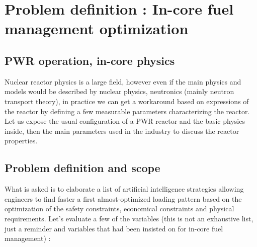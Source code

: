 \section{Problem definition : In-core fuel management optimization}

\subsection{PWR operation, in-core physics}

\noindent Nuclear reactor physics is a large field, however even if the main physics and models would be described by nuclear physics, neutronics (mainly neutron transport theory), in practice we can get a workaround based on expressions of the reactor by defining a few measurable parameters characterizing the reactor. Let us expose the usual configuration of a PWR reactor and the basic physics inside, then the main parameters used in the industry to discuss the reactor properties. 

\subsection{Problem definition and scope}
What is asked is to elaborate a list of artificial intelligence strategies allowing engineers to find faster a first almost-optimized loading pattern based on the optimization of the safety constraints, economical constraints and physical requirements. Let's evaluate a few of the variables (this is not an exhaustive list, just a reminder and variables that had been insisted on for in-core fuel management) : 

